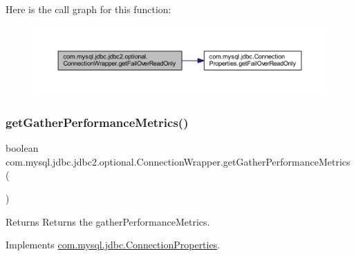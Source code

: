 Here is the call graph for this function\+:
\nopagebreak
\begin{figure}[H]
\begin{center}
\leavevmode
\includegraphics[width=350pt]{classcom_1_1mysql_1_1jdbc_1_1jdbc2_1_1optional_1_1_connection_wrapper_a04fd603d5a300468472f5ddc26e5a56c_cgraph}
\end{center}
\end{figure}
\mbox{\label{classcom_1_1mysql_1_1jdbc_1_1jdbc2_1_1optional_1_1_connection_wrapper_ae72446f233d8b35fc273fa47006502d0}} 
\subsubsection{\texorpdfstring{get\+Gather\+Performance\+Metrics()}{getGatherPerformanceMetrics()}}
{\footnotesize\ttfamily boolean com.\+mysql.\+jdbc.\+jdbc2.\+optional.\+Connection\+Wrapper.\+get\+Gather\+Performance\+Metrics (\begin{DoxyParamCaption}{ }\end{DoxyParamCaption})}

\begin{DoxyReturn}{Returns}
Returns the gather\+Performance\+Metrics. 
\end{DoxyReturn}


Implements \mbox{\hyperlink{interfacecom_1_1mysql_1_1jdbc_1_1_connection_properties_a90f58aa61c84d2072ba37c902aef8f9e}{com.\+mysql.\+jdbc.\+Connection\+Properties}}.

